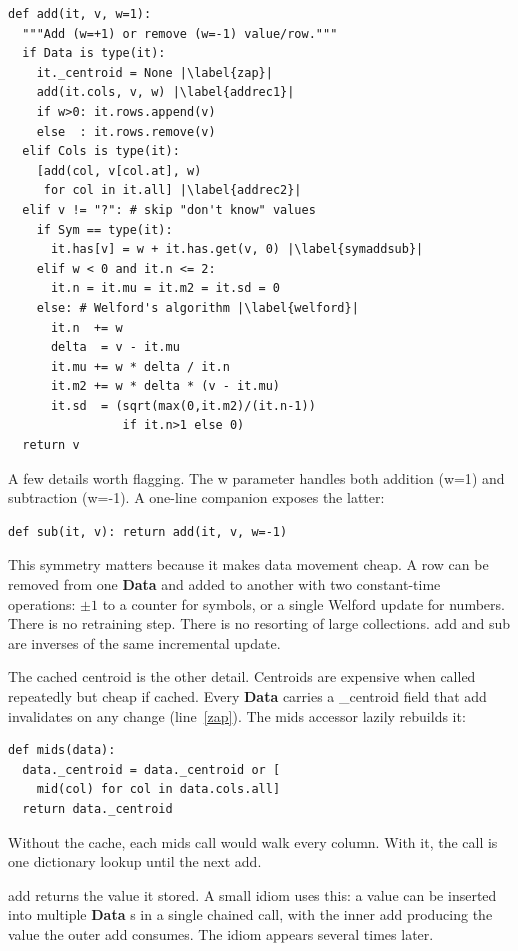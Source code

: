 \documentclass[AMA,STIX2COL]{WileyNJDv5}
\newcommand{\cls}[1]{%
  \setlength{\fboxsep}{1.5pt}%
  \colorbox{clsbg}{\sffamily\bfseries{#1}}%
}
\begin{document}
\begin{verbatim}
def add(it, v, w=1):
  """Add (w=+1) or remove (w=-1) value/row."""
  if Data is type(it):
    it._centroid = None |\label{zap}|
    add(it.cols, v, w) |\label{addrec1}|
    if w>0: it.rows.append(v)
    else  : it.rows.remove(v)
  elif Cols is type(it):
    [add(col, v[col.at], w)
     for col in it.all] |\label{addrec2}|
  elif v != "?": # skip "don't know" values
    if Sym == type(it):
      it.has[v] = w + it.has.get(v, 0) |\label{symaddsub}|
    elif w < 0 and it.n <= 2:
      it.n = it.mu = it.m2 = it.sd = 0
    else: # Welford's algorithm |\label{welford}|
      it.n  += w
      delta  = v - it.mu
      it.mu += w * delta / it.n
      it.m2 += w * delta * (v - it.mu)
      it.sd  = (sqrt(max(0,it.m2)/(it.n-1))
                if it.n>1 else 0)
  return v
\end{verbatim}

A few details worth flagging. The \textsf{w} parameter handles
both addition (\textsf{w=1}) and subtraction (\textsf{w=-1}).
A one-line companion exposes the latter:

\begin{verbatim}
def sub(it, v): return add(it, v, w=-1)
\end{verbatim}

This symmetry matters because it makes data movement cheap. A
row can be removed from one \cls{Data} and added to another
with two constant-time operations: $\pm 1$ to a counter for
symbols, or a single Welford update for numbers. There is no
retraining step. There is no resorting of large collections.
\textsf{add} and \textsf{sub} are inverses of the same
incremental update.

The cached centroid is the other detail. Centroids are
expensive when called repeatedly but cheap if cached. Every
\cls{Data} carries a \textsf{\_centroid} field that
\textsf{add} invalidates on any change (line~\ref{zap}). The
\textsf{mids} accessor lazily rebuilds it:

\begin{verbatim}
def mids(data):
  data._centroid = data._centroid or [
    mid(col) for col in data.cols.all]
  return data._centroid
\end{verbatim}

Without the cache, each \textsf{mids} call would walk every
column. With it, the call is one dictionary lookup until the
next \textsf{add}.

\textsf{add} returns the value it stored. A small idiom uses
this: a value can be inserted into multiple \cls{Data}s in a
single chained call, with the inner \textsf{add} producing the
value the outer \textsf{add} consumes. The idiom appears
several times later.
\end{document}

